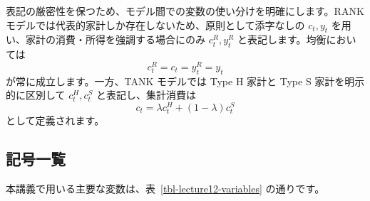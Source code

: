 \documentclass[
  japanese,
  lualatex,
  ja=standard,
  12pt,
  a4paper]{ltjsarticle}
\begin{document}
表記の厳密性を保つため、モデル間での変数の使い分けを明確にします。RANK
モデルでは代表的家計しか存在しないため、原則として添字なしの
\(c_t, y_t\) を用い、家計の消費・所得を強調する場合にのみ
\(c_t^R, y_t^R\) と表記します。均衡においては \[
c_t^R = c_t = y_t^R = y_t
\] が常に成立します。一方、TANK モデルでは Type H 家計と Type S
家計を明示的に区別して \(c_t^H, c_t^S\) と表記し、集計消費は \[
c_t = \lambda c_t^H + (1-\lambda) c_t^S
\] として定義されます。


\subsection{記号一覧}\label{ux8a18ux53f7ux4e00ux89a7}

本講義で用いる主要な変数は、表~\ref{tbl-lecture12-variables}
の通りです。
\end{document}
